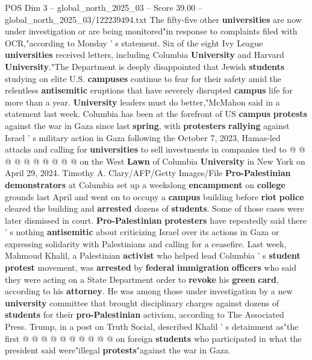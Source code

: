 \begin{textsample}{POS Dim 3 – global\_north\_2025\_03 – Score 39.00 – global\_north\_2025\_03/122239494.txt}
The fifty-five other \textbf{universities} are now under investigation or are being monitored"in response to complaints filed with OCR,"according to Monday ' s statement.
Six of the eight Ivy League \textbf{universities} received letters, including Columbia \textbf{University} and Harvard \textbf{University}."The Department is deeply disappointed that Jewish \textbf{students} studying on elite U.S. \textbf{campuses} continue to fear for their safety amid the relentless \textbf{antisemitic} eruptions that have severely disrupted \textbf{campus} life for more than a year. \textbf{University} leaders must do better,"McMahon said in a statement last week.
Columbia has been at the forefront of US \textbf{campus} \textbf{protests} against the war in Gaza since last \textbf{spring}, with \textbf{protesters} \textbf{rallying} against Israel ' s military action in Gaza following the October 7, 2023, Hamas-led attacks and calling for \textbf{universities} to sell investments in companies tied to @ @ @ @ @ @ @ @ @ @ on the West \textbf{Lawn} of Columbia \textbf{University} in New York on April 29, 2024.
Timothy A.
Clary/AFP/Getty Images/File \textbf{Pro-Palestinian} \textbf{demonstrators} at Columbia set up a weekslong \textbf{encampment} on \textbf{college} grounds last April and went on to occupy a \textbf{campus} building before \textbf{riot} \textbf{police} cleared the building and \textbf{arrested} dozens of \textbf{students}.
Some of those cases were later dismissed in court. \textbf{Pro-Palestinian} \textbf{protesters} have repeatedly said there ' s nothing \textbf{antisemitic} about criticizing Israel over its actions in Gaza or expressing solidarity with Palestinians and calling for a ceasefire.
Last week, Mahmoud Khalil, a Palestinian \textbf{activist} who helped lead Columbia ' s \textbf{student} \textbf{protest} movement, was \textbf{arrested} by \textbf{federal} \textbf{immigration} \textbf{officers} who said they were acting on a State Department order to \textbf{revoke} his \textbf{green} \textbf{card}, according to his \textbf{attorney}.
He was among those under investigation by a new \textbf{university} committee that brought disciplinary charges against dozens of \textbf{students} for their \textbf{pro-Palestinian} activism, according to The Associated Press.
Trump, in a post on Truth Social, described Khalil ' s detainment as"the first @ @ @ @ @ @ @ @ @ @ on foreign \textbf{students} who participated in what the president said were"illegal \textbf{protests}"against the war in Gaza.

\end{textsample}
